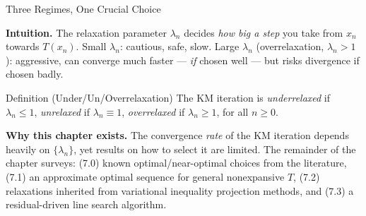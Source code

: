 \documentclass[aspectratio=169,10pt]{beamer}
\begin{document}
\begin{frame}{Three Regimes, One Crucial Choice}

  \textbf{Intuition.} The relaxation parameter $\lambda_n$ decides
  \emph{how big a step} you take from $x_n$ towards $T(x_n)$.
  Small $\lambda_n$: cautious, safe, slow. Large $\lambda_n$
  (overrelaxation, $\lambda_n>1$): aggressive, can converge much
  faster --- \emph{if} chosen well --- but risks divergence if
  chosen badly.

  \begin{block}{Definition (Under/Un/Overrelaxation)}
    The KM iteration is \emph{underrelaxed} if $\lambda_n\le1$,
    \emph{unrelaxed} if $\lambda_n\equiv1$, \emph{overrelaxed} if
    $\lambda_n\ge1$, for all $n\ge0$.
  \end{block}

  \textbf{Why this chapter exists.} The convergence \emph{rate} of
  the KM iteration depends heavily on $\{\lambda_n\}$, yet results
  on how to select it are limited. The remainder of the chapter
  surveys: (7.0) known optimal/near-optimal choices from the
  literature, (7.1) an approximate optimal sequence for general
  nonexpansive $T$, (7.2) relaxations inherited from variational
  inequality projection methods, and (7.3) a residual-driven line
  search algorithm.

\end{frame}
\end{document}
